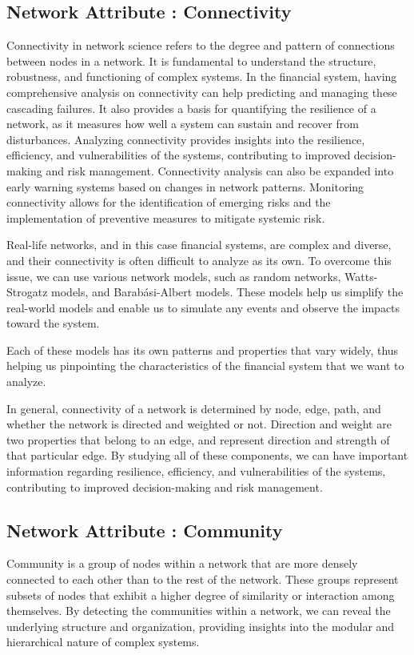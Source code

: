 \documentclass[a4paper,11pt]{article}
\begin{document}
\subsection{Network Attribute : Connectivity}
Connectivity in network science refers to the degree and pattern of connections between nodes in a network. It is fundamental to understand the structure, robustness, and functioning of complex systems. In the financial system, having comprehensive analysis on connectivity can help predicting and managing these cascading failures. It also provides a basis for quantifying the resilience of a network, as it measures how well a system can sustain and recover from disturbances. Analyzing connectivity provides insights into the resilience, efficiency, and vulnerabilities of the systems, contributing to improved decision-making and risk management. Connectivity analysis can also be expanded into early warning systems based on changes in network patterns. Monitoring connectivity allows for the identification of emerging risks and the implementation of preventive measures to mitigate systemic risk.

Real-life networks, and in this case financial systems, are complex and diverse, and their connectivity is often difficult to analyze as its own. To overcome this issue, we can use various network models, such as random networks, Watts-Strogatz models, and Barabási-Albert models. These models help us simplify the real-world models and enable us to simulate any events and observe the impacts toward the system. 

Each of these models has its own patterns and properties that vary widely, thus helping us pinpointing the characteristics of the financial system that we want to analyze.

In general, connectivity of a network is determined by node, edge, path, and whether the network is directed and weighted or not. Direction and weight are two properties that belong to an edge, and represent direction and strength of that particular edge. By studying all of these components, we can have important information regarding resilience, efficiency, and vulnerabilities of the systems, contributing to improved decision-making and risk management.

\subsection{Network Attribute : Community}
Community is a group of nodes within a network that are more densely connected to each other than to the rest of the network. These groups represent subsets of nodes that exhibit a higher degree of similarity or interaction among themselves. By detecting the communities within a network, we can reveal the underlying structure and organization, providing insights into the modular and hierarchical nature of complex systems.
\end{document}
